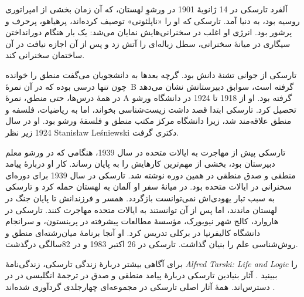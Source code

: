 \documentclass[../../../include/open-logic-section]{subfiles}
\begin{document}



آلفرد تارسکی در 14 ژانویهٔ 1901 در ورشوِ لهستان، که آن زمان بخشی از
امپراتوری روسیه بود، به دنیا آمد. تارسکی که او را «ناپلئونی» توصیف
کرده‌اند، پرهیاهو، پرحرف و پرشور بود. انرژی او اغلب در سخنرانی‌هایش
نمایان می‌شد: یک بار هنگام دورانداختن سیگاری در میانهٔ سخنرانی، سطل
زباله‌ای را آتش زد و پس از آن اجازه نیافت در آن ساختمان سخنرانی کند.

تارسکی از جوانی تشنهٔ دانش بود. گرچه بعدها به دانشجویان می‌گفت منطق را
خوانده چون تنها درسی بوده که در آن نمرهٔ~B گرفته است، سوابق دبیرستانش
نشان می‌دهد در همهٔ درس‌ها، حتی منطق، نمرهٔ A گرفته بود. او از 1918 تا
1924 در دانشگاه ورشو تحصیل کرد. تارسکی ابتدا قصد داشت زیست‌شناسی
بخواند، اما به ریاضیات، فلسفه و منطق علاقه‌مند شد، زیرا دانشگاه مرکز
مکتب منطق و فلسفهٔ ورشو بود. او در سال 1924 زیر نظر
Stanis\l{}aw Le\'{s}niewski دکتری گرفت.

تارسکی پیش از مهاجرت به ایالات متحده در سال 1939، هنگامی که در ورشو
معلم دبیرستان بود، بخشی از مهم‌ترین کارهایش را به پایان رساند. کار او
دربارهٔ پیامد منطقی و صدق منطقی در همین دوره نوشته شد. تارسکی در سال
1939 برای دوره‌ای سخنرانی در ایالات متحده بود. در میانهٔ سفر او آلمان
به لهستان حمله کرد و تارسکی به سبب تبار یهودی‌اش نمی‌توانست بازگردد.
همسر و فرزندانش تا پایان جنگ در لهستان ماندند، اما پس از آن توانستند
به ایالات متحده مهاجرت کنند. تارسکی در هاروارد، کالج شهر نیویورک،
مؤسسهٔ مطالعات پیشرفته در پرینستون، و سرانجام دانشگاه کالیفرنیا در
برکلی تدریس کرد. او آنجا برنامهٔ میان‌رشته‌ای منطق و روش‌شناسی علم را
بنیان گذاشت. تارسکی در 26 اکتبر 1983 و در 82سالگی درگذشت.

\begin{reading}
برای آگاهی بیشتر دربارهٔ زندگی تارسکی، زندگی‌نامهٔ
\emph{Alfred Tarski: Life and Logic} را ببینید \citep{Feferman2004}.
آثار بنیادین تارسکی دربارهٔ پیامد منطقی و صدق در ترجمهٔ انگلیسی در
\citep{Tarski1983} در دسترس‌اند. همهٔ آثار اصلی تارسکی در مجموعه‌ای
چهارجلدی گردآوری شده‌اند \citep{Tarski1981}.
\end{reading}
\end{document}
